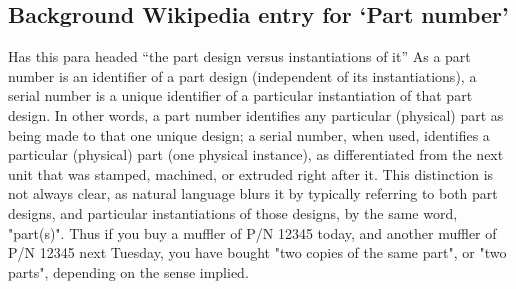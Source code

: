 \subsection{Background Wikipedia entry for `Part number'}
Has this para headed ``the part design versus instantiations of it''
As a part number is an identifier of a part design (independent of its instantiations), a serial number is a unique identifier of a particular instantiation of that part design. In other words, a part number identifies any particular (physical) part as being made to that one unique design; a serial number, when used, identifies a particular (physical) part (one physical instance), as differentiated from the next unit that was stamped, machined, or extruded right after it. This distinction is not always clear, as natural language blurs it by typically referring to both part designs, and particular instantiations of those designs, by the same word, "part(s)". Thus if you buy a muffler of P/N 12345 today, and another muffler of P/N 12345 next Tuesday, you have bought "two copies of the same part", or "two parts", depending on the sense implied.

